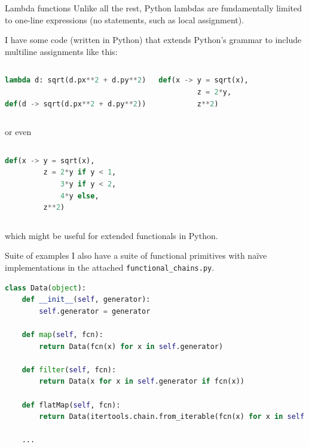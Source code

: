 \documentclass{beamer}
\begin{document}
\begin{frame}[fragile]{Lambda functions}
\vspace{0.25 cm}
Unlike all the rest, Python lambdas are fundamentally limited to one-line expressions (no statements, such as local assignment).

\vfill
I have some code (written in Python) that extends Python's grammar to include multiline assignments like this:

\vfill
\begin{columns}
\begin{lstlisting}[language=python, basicstyle=\ttfamily\scriptsize, frame=single]
lambda d: sqrt(d.px**2 + d.py**2)

def(d -> sqrt(d.px**2 + d.py**2))
\end{lstlisting}
\begin{lstlisting}[language=python, basicstyle=\ttfamily\scriptsize, frame=single]
def(x -> y = sqrt(x),
         z = 2*y,
         z**2)
\end{lstlisting}
\end{columns}

\vfill
or even

\vfill
\begin{columns}
\begin{lstlisting}[language=python, basicstyle=\ttfamily\scriptsize, frame=single]
def(x -> y = sqrt(x),
         z = 2*y if y < 1,
             3*y if y < 2,
             4*y else,
         z**2)
\end{lstlisting}
\end{columns}

\vfill
which might be useful for extended functionals in Python.
\end{frame}

\begin{frame}[fragile]{Suite of examples}
\vspace{0.5 cm}
I also have a suite of functional primitives with na\"ive implementations in the attached {\tt\small functional\_chains.py}.

\vspace{0.25 cm}
\begin{lstlisting}[language=python, basicstyle=\ttfamily\scriptsize]
class Data(object):
    def __init__(self, generator):
        self.generator = generator

    def map(self, fcn):
        return Data(fcn(x) for x in self.generator)

    def filter(self, fcn):
        return Data(x for x in self.generator if fcn(x))

    def flatMap(self, fcn):
        return Data(itertools.chain.from_iterable(fcn(x) for x in self.generator))

    ...
\end{lstlisting}
\end{frame}
\end{document}
